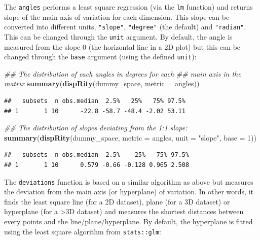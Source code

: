\documentclass[]{book}
\newenvironment{Shaded}{\begin{snugshade}}{\end{snugshade}}
\newcommand{\CommentTok}[1]{\textcolor[rgb]{0.56,0.35,0.01}{\textit{#1}}}
\newcommand{\DataTypeTok}[1]{\textcolor[rgb]{0.13,0.29,0.53}{#1}}
\newcommand{\DecValTok}[1]{\textcolor[rgb]{0.00,0.00,0.81}{#1}}
\newcommand{\KeywordTok}[1]{\textcolor[rgb]{0.13,0.29,0.53}{\textbf{#1}}}
\newcommand{\NormalTok}[1]{#1}
\newcommand{\StringTok}[1]{\textcolor[rgb]{0.31,0.60,0.02}{#1}}
\begin{document}
The \texttt{angles} performs a least square regression (via the \texttt{lm} function) and returns slope of the main axis of variation for each dimension. This slope can be converted into different units, \texttt{"slope"}, \texttt{"degree"} (the default) and \texttt{"radian"}. This can be changed through the \texttt{unit} argument.
By default, the angle is measured from the slope 0 (the horizontal line in a 2D plot) but this can be changed through the \texttt{base} argument (using the defined \texttt{unit}):

\begin{Shaded}
\begin{Highlighting}[]
\CommentTok{## The distribution of each angles in degrees for each}
\CommentTok{## main axis in the matrix}
\KeywordTok{summary}\NormalTok{(}\KeywordTok{dispRity}\NormalTok{(dummy_space, }\DataTypeTok{metric =}\NormalTok{ angles))}
\end{Highlighting}
\end{Shaded}

\begin{verbatim}
##   subsets  n obs.median  2.5%   25%   75% 97.5%
## 1       1 10      -22.8 -58.7 -48.4 -2.02 53.11
\end{verbatim}

\begin{Shaded}
\begin{Highlighting}[]
\CommentTok{## The distribution of slopes deviating from the 1:1 slope:}
\KeywordTok{summary}\NormalTok{(}\KeywordTok{dispRity}\NormalTok{(dummy_space, }\DataTypeTok{metric =}\NormalTok{ angles, }\DataTypeTok{unit =} \StringTok{"slope"}\NormalTok{,}
                 \DataTypeTok{base =} \DecValTok{1}\NormalTok{))}
\end{Highlighting}
\end{Shaded}

\begin{verbatim}
##   subsets  n obs.median  2.5%    25%   75% 97.5%
## 1       1 10      0.579 -0.66 -0.128 0.965 2.508
\end{verbatim}

The \texttt{deviations} function is based on a similar algorithm as above but measures the deviation from the main axis (or hyperplane) of variation.
In other words, it finds the least square line (for a 2D dataset), plane (for a 3D dataset) or hyperplane (for a \textgreater{}3D dataset) and measures the shortest distances between every points and the line/plane/hyperplane.
By default, the hyperplane is fitted using the least square algorithm from \texttt{stats::glm}:
\end{document}
